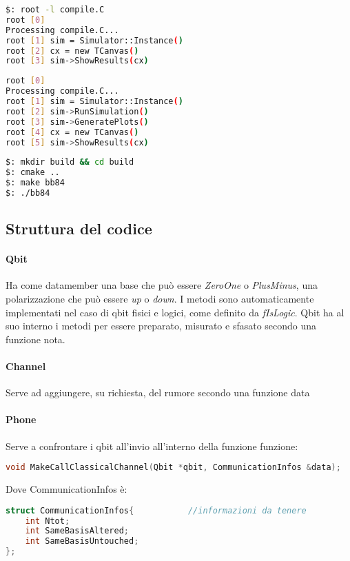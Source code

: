 \documentclass[11 pt, a4paper]{article}
\begin{document}
\begin{lstlisting}[language=bash, style=myRoot]
$: root -l compile.C
root [0] 
Processing compile.C...
root [1] sim = Simulator::Instance()
root [2] cx = new TCanvas()
root [3] sim->ShowResults(cx) 
\end{lstlisting}


\begin{lstlisting}[language=bash, style=myRoot]
root [0] 
Processing compile.C...
root [1] sim = Simulator::Instance()
root [2] sim->RunSimulation()
root [3] sim->GeneratePlots()
root [4] cx = new TCanvas()
root [5] sim->ShowResults(cx)
\end{lstlisting}

\begin{lstlisting}[language=bash]
$: mkdir build && cd build
$: cmake ..
$: make bb84
$: ./bb84
\end{lstlisting}

\subsection{Struttura del codice}
\paragraph{Qbit}
Ha come datamember una base che può essere \textit{ZeroOne} o \textit{PlusMinus}, una polarizzazione che può essere \textit{up} o \textit{down}.
I metodi sono automaticamente implementati nel caso di qbit fisici e logici, come definito da \textit{fIsLogic}.
Qbit ha al suo interno i metodi per essere preparato, misurato e sfasato secondo una funzione nota.

\paragraph{Channel}
Serve ad aggiungere, su richiesta, del rumore secondo una funzione data

\paragraph{Phone}
Serve a confrontare i qbit all'invio all'interno della funzione funzione:
\begin{lstlisting}[style=myRoot, language=C++]
void MakeCallClassicalChannel(Qbit *qbit, CommunicationInfos &data);
\end{lstlisting}
Dove CommunicationInfos è:
\begin{lstlisting}[language=C++, style=myRoot]
struct CommunicationInfos{           //informazioni da tenere
    int Ntot;                    
    int SameBasisAltered;
    int SameBasisUntouched;
};
\end{lstlisting}
\end{document}
